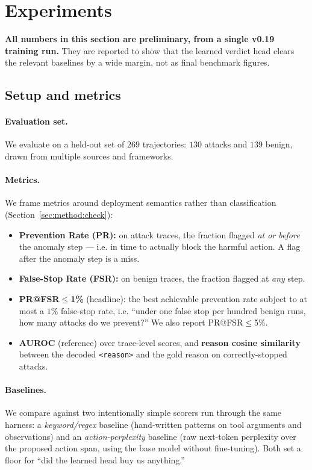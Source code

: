 \section{Experiments}
\label{sec:experiments}

\textbf{All numbers in this section are preliminary, from a single v0.19
training run.} They are reported to show that the learned verdict head clears
the relevant baselines by a wide margin, not as final benchmark figures.

\subsection{Setup and metrics}

\paragraph{Evaluation set.}
We evaluate on a held-out set of $269$ trajectories: $130$ attacks and $139$
benign, drawn from multiple sources and frameworks.

\paragraph{Metrics.}
We frame metrics around deployment semantics rather than classification
(Section~\ref{sec:method:check}):
\begin{itemize}[leftmargin=1.4em,itemsep=0.1em]
  \item \textbf{Prevention Rate (PR):} on attack traces, the fraction flagged
        \emph{at or before} the anomaly step --- i.e. in time to actually block
        the harmful action. A flag after the anomaly step is a miss.
  \item \textbf{False-Stop Rate (FSR):} on benign traces, the fraction flagged
        at \emph{any} step.
  \item \textbf{PR@FSR$\le$1\%} (headline): the best achievable prevention rate
        subject to at most a $1\%$ false-stop rate, i.e. ``under one false stop
        per hundred benign runs, how many attacks do we prevent?'' We also
        report PR@FSR$\le$5\%.
  \item \textbf{AUROC} (reference) over trace-level scores, and
        \textbf{reason cosine similarity} between the decoded \texttt{<reason>}
        and the gold reason on correctly-stopped attacks.
\end{itemize}

\paragraph{Baselines.}
We compare against two intentionally simple scorers run through the same
harness: a \emph{keyword/regex} baseline (hand-written patterns on tool
arguments and observations) and an \emph{action-perplexity} baseline (raw
next-token perplexity over the proposed action span, using the base model
without fine-tuning). Both set a floor for ``did the learned head buy us
anything.''

